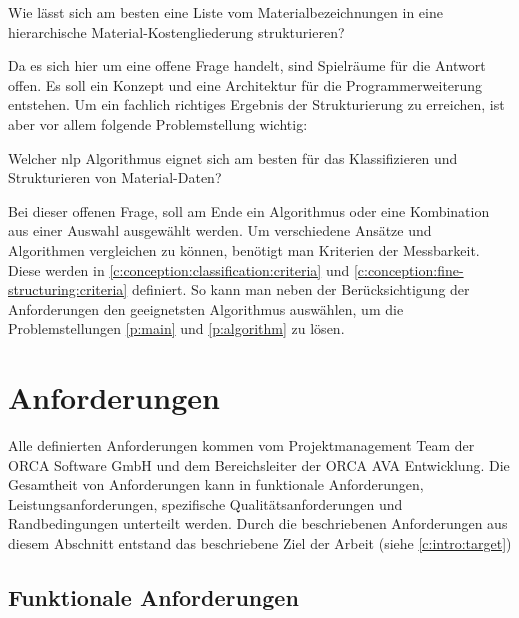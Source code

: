 \begin{problem}
	\label{p:main}
	Wie lässt sich am besten eine Liste vom Materialbezeichnungen in eine hierarchische Material-Kostengliederung strukturieren?
\end{problem}

Da es sich hier um eine offene Frage handelt, sind Spielräume für die Antwort offen. Es soll ein Konzept und eine Architektur für die Programmerweiterung entstehen. Um ein fachlich richtiges Ergebnis der Strukturierung zu erreichen, ist aber vor allem folgende Problemstellung wichtig:

\begin{problem}
	\label{p:algorithm}
	Welcher \ac{nlp} Algorithmus eignet sich am besten für das Klassifizieren und Strukturieren von Material-Daten? 
\end{problem}

Bei dieser offenen Frage, soll am Ende ein Algorithmus oder eine Kombination aus einer Auswahl ausgewählt werden. Um verschiedene Ansätze und Algorithmen vergleichen zu können, benötigt man Kriterien der Messbarkeit. Diese werden in \autoref{c:conception:classification:criteria} und \autoref{c:conception:fine-structuring:criteria} definiert. So kann man neben der Berücksichtigung der Anforderungen den geeignetsten Algorithmus auswählen, um die Problemstellungen \ref{p:main} und \ref{p:algorithm} zu lösen.


\section{Anforderungen}
\label{c:requirements:requirements}
Alle definierten Anforderungen kommen vom Projektmanagement Team der ORCA Software GmbH und dem Bereichsleiter der ORCA AVA Entwicklung. Die Gesamtheit von Anforderungen kann in funktionale Anforderungen, Leistungsanforderungen, spezifische Qualitätsanforderungen und Randbedingungen unterteilt werden.\citep[vgl.][]{glinz_2007} Durch die beschriebenen Anforderungen aus diesem Abschnitt entstand das beschriebene Ziel der Arbeit (siehe \autoref{c:intro:target})

\subsection{Funktionale Anforderungen}
\label{c:requirements:requirements:functional}

